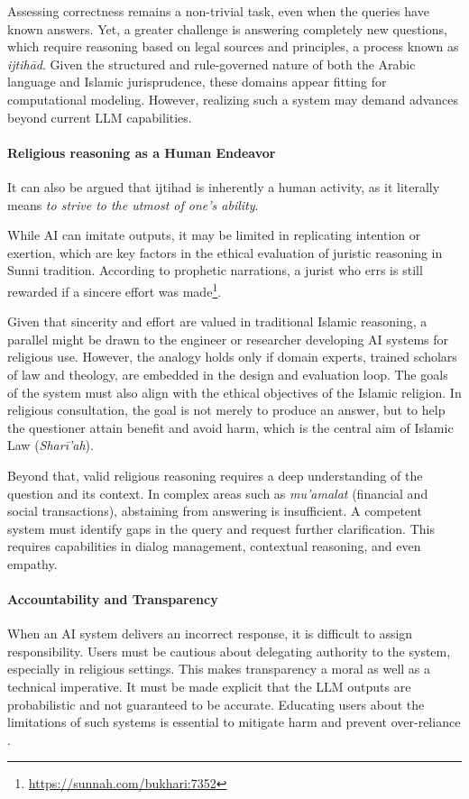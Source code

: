 \documentclass[letterpaper]{article}
\begin{document}
Assessing correctness remains a non-trivial task, even when the queries have known answers. Yet, a greater challenge is answering completely new questions, which require reasoning based on legal sources and principles, a process known as \emph{ijtihād}. Given the structured and rule-governed nature of both the Arabic language and Islamic jurisprudence, these domains appear fitting for computational modeling. However, realizing such a system may demand advances beyond current LLM capabilities.

\paragraph{Religious reasoning as a Human Endeavor}
It can also be argued that ijtihad is inherently a human activity, as it literally means  \textit{to strive to the utmost of one's ability}.

While AI can imitate outputs, it may be limited in replicating intention or exertion, which are key factors in the ethical evaluation of juristic reasoning in Sunni tradition. 
According to prophetic narrations, a jurist who errs is still rewarded if a sincere effort was made\footnote{\url{https://sunnah.com/bukhari:7352}}.

Given that sincerity and effort are valued in traditional Islamic reasoning, a parallel might be drawn to the engineer or researcher developing AI systems for religious use. However, the analogy holds only if domain experts, trained scholars of law and theology, are embedded in the design and evaluation loop. The goals of the system must also align with the ethical objectives of the Islamic religion. In religious consultation, the goal is not merely to produce an answer, but to help the questioner attain benefit and avoid harm, which is the central aim of Islamic Law (\emph{Sharī'ah}).

Beyond that, valid religious reasoning requires a deep understanding of the question and its context. In complex areas such as \emph{mu'amalat} (financial and social transactions), abstaining from answering is insufficient. A competent system must identify gaps in the query and request further clarification. This requires capabilities in dialog management, contextual reasoning, and even empathy.

\paragraph{Accountability and Transparency}
When an AI system delivers an incorrect response, it is difficult to assign responsibility. Users must be cautious about delegating authority to the system, especially in religious settings. This makes transparency a moral as well as a technical imperative. It must be made explicit that the LLM outputs are probabilistic and not guaranteed to be accurate. Educating users about the limitations of such systems is essential to mitigate harm and prevent over-reliance \cite{antiquaetnova2025}.
\end{document}
